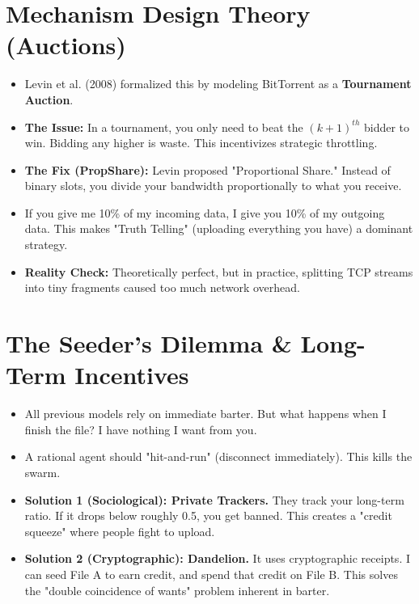 \documentclass[11pt, letterpaper]{article}
\begin{document}
\section{Mechanism Design Theory (Auctions)}
\begin{itemize}
    \item Levin et al. (2008) formalized this by modeling BitTorrent as a \textbf{Tournament Auction}.
    \item \textbf{The Issue:} In a tournament, you only need to beat the $(k+1)^{th}$ bidder to win. Bidding any higher is waste. This incentivizes strategic throttling.
    \item \textbf{The Fix (PropShare):} Levin proposed "Proportional Share." Instead of binary slots, you divide your bandwidth proportionally to what you receive.
    \item If you give me 10\% of my incoming data, I give you 10\% of my outgoing data. This makes "Truth Telling" (uploading everything you have) a dominant strategy.
    \item \textbf{Reality Check:} Theoretically perfect, but in practice, splitting TCP streams into tiny fragments caused too much network overhead.
\end{itemize}

\section{The Seeder's Dilemma \& Long-Term Incentives}
\begin{itemize}
    \item All previous models rely on immediate barter. But what happens when I finish the file? I have nothing I want from you.
    \item A rational agent should "hit-and-run" (disconnect immediately). This kills the swarm.
    \item \textbf{Solution 1 (Sociological): Private Trackers.} They track your long-term ratio. If it drops below roughly 0.5, you get banned. This creates a "credit squeeze" where people fight to upload.
    \item \textbf{Solution 2 (Cryptographic): Dandelion.} It uses cryptographic receipts. I can seed File A to earn credit, and spend that credit on File B. This solves the "double coincidence of wants" problem inherent in barter.
\end{itemize}
\end{document}

